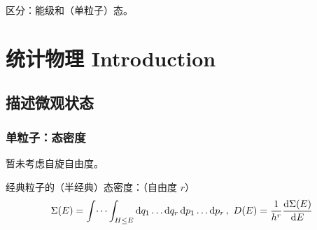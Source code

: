区分：能级和（单粒子）态。

\section{统计物理 Introduction}

\subsection{描述微观状态}

\subsubsection{单粒子：态密度}

暂未考虑自旋自由度。

\begin{framed}
    经典粒子的（半经典）态密度：（自由度 $r$）\[
        \Sigma(E) = \int \dots \int_{H \leq E}\dd{q_1} \dots \dd{q_r} \dd{p_1} \dots \dd{p_r},\ D(E) = \frac{1}{h^r} \dv{\Sigma(E)}{E}
    \]


\end{framed}
